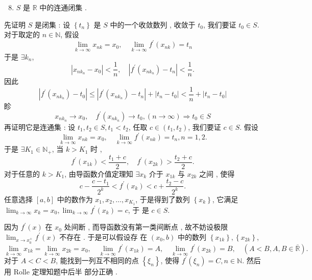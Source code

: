 \documentclass[10pt]{article}
\begin{document}
\begin{enumerate}
  \setcounter{enumi}{7}
  \item $S$  是  $\mathbb{R}$  中的连通闭集 .
\end{enumerate}
 先证明  $S$  是闭集 :  设  $\left\{t_{n}\right\}$  是  $S$  中的一个收敛数列 ,  收敛于  $t_{0}$,  我们要证  $t_{0} \in S$.  对于取定的  $n \in \mathbb{N}$,  假设 
$$
\lim _{k \rightarrow \infty} x_{n k}=x_{0}, \quad \lim _{k \rightarrow \infty} f^{\prime}\left(x_{n k}\right)=t_{n}
$$
 于是  $\exists k_{n}$,
$$
\left|x_{n k_{n}}-x_{0}\right|<\frac{1}{n}, \quad\left|f^{\prime}\left(x_{n k_{n}}\right)-t_{n}\right|<\frac{1}{n} .
$$
 因此 
$$
\left|f^{\prime}\left(x_{n k_{n}}\right)-t_{0}\right| \leqslant\left|f^{\prime}\left(x_{n k_{n}}\right)-t_{n}\right|+\left|t_{n}-t_{0}\right|<\frac{1}{n}+\left|t_{n}-t_{0}\right|
$$
 眕 
$$
x_{n k_{n}} \rightarrow x_{0}, \quad f^{\prime}\left(x_{n k_{n}}\right) \rightarrow t_{0},(n \rightarrow \infty) \Longrightarrow t_{0} \in S
$$
 再证明它是连通集 :  设  $t_{1}, t_{2} \in S, t_{1}<t_{2}$,  任取  $c \in\left(t_{1}, t_{2}\right)$,  我们要证  $c \in S$.  假设 
$$
\lim _{k \rightarrow \infty} x_{n k}=x_{0}, \quad \lim _{k \rightarrow \infty} f^{\prime}\left(x_{n k}\right)=t_{n}, n=1,2 .
$$
 于是  $\exists K_{1} \in \mathbb{N}_{+}$,  当  $k>K_{1}$  时 ,
$$
f^{\prime}\left(x_{1 k}\right)<\frac{t_{1}+c}{2}, \quad f^{\prime}\left(x_{2 k}\right)>\frac{t_{2}+c}{2} .
$$
 对于任意的  $k>K_{1}$,  由导函数介值定理知  $\exists x_{k}$  介于  $x_{1 k}$  与  $x_{2 k}$  之间 ,  使得 
$$
c-\frac{c-t_{1}}{2^{k}}<f^{\prime}\left(x_{k}\right)<c+\frac{t_{2}-c}{2^{k}} .
$$
 任意选择  $[a, b]$  中的数作为  $x_{1}, x_{2}, \ldots, x_{K_{1}}$,  于是得到了数列  $\left\{x_{k}\right\}$,  它满足  $\lim _{k \rightarrow \infty} x_{k}=x_{0}, \lim _{k \rightarrow \infty} f^{\prime}\left(x_{k}\right)=c$,  于   是  $c \in S$.

 因为  $f^{\prime}(x)$  在  $x_{0}$  处间断 ,  而导函数没有第一类间断点 ,  故不妨设极限  $\lim _{x \rightarrow x_{0}^{+}} f^{\prime}(x)$  不存在 .  于是可以假设存   在  $\left(x_{0}, b\right)$  中的数列  $\left\{x_{1 k}\right\},\left\{x_{2 k}\right\}$,
$$
\lim _{k \rightarrow \infty} x_{1 k}=\lim _{k \rightarrow \infty} x_{2 k}=x_{0}, \quad \lim _{k \rightarrow \infty} f^{\prime}\left(x_{1 k}\right)=A, \quad \lim _{k \rightarrow \infty} f^{\prime}\left(x_{2 k}\right)=B, \quad(A<B, A, B \in \overline{\mathbb{R}}) .
$$
 对于  $A<C<B$,  能找到一列互不相同的点  $\left\{\xi_{n}\right\}$,  使得  $f^{\prime}\left(\xi_{n}\right)=C, n \in \mathbb{N}$.  然后用  Rolle  定理知题中后半   部分正确 .
\end{document}
